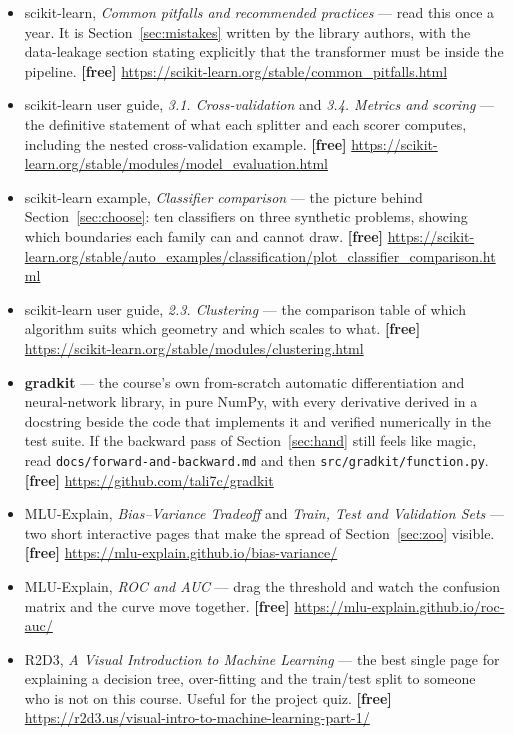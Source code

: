 \documentclass[11pt]{article}
\begin{document}
\begin{itemize}[leftmargin=*]
  \item scikit-learn, \emph{Common pitfalls and recommended practices} ---
    read this once a year. It is Section~\ref{sec:mistakes} written by the
    library authors, with the data-leakage section stating explicitly that
    the transformer must be inside the pipeline. \textbf{[free]}
    \url{https://scikit-learn.org/stable/common_pitfalls.html}
  \item scikit-learn user guide, \emph{3.1. Cross-validation} and
    \emph{3.4. Metrics and scoring} --- the definitive statement of what each
    splitter and each scorer computes, including the nested
    cross-validation example. \textbf{[free]}
    \url{https://scikit-learn.org/stable/modules/model_evaluation.html}
  \item scikit-learn example, \emph{Classifier comparison} --- the picture
    behind Section~\ref{sec:choose}: ten classifiers on three synthetic
    problems, showing which boundaries each family can and cannot draw.
    \textbf{[free]}
    \url{https://scikit-learn.org/stable/auto_examples/classification/plot_classifier_comparison.html}
  \item scikit-learn user guide, \emph{2.3. Clustering} --- the comparison
    table of which algorithm suits which geometry and which scales to what.
    \textbf{[free]} \url{https://scikit-learn.org/stable/modules/clustering.html}
  \item \textbf{gradkit} --- the course's own from-scratch automatic
    differentiation and neural-network library, in pure NumPy, with every
    derivative derived in a docstring beside the code that implements it and
    verified numerically in the test suite. If the backward pass of
    Section~\ref{sec:hand} still feels like magic, read
    \texttt{docs/forward-and-backward.md} and then
    \texttt{src/gradkit/function.py}. \textbf{[free]}
    \url{https://github.com/tali7c/gradkit}
  \item MLU-Explain, \emph{Bias--Variance Tradeoff} and
    \emph{Train, Test and Validation Sets} --- two short interactive pages
    that make the spread of Section~\ref{sec:zoo} visible.
    \textbf{[free]} \url{https://mlu-explain.github.io/bias-variance/}
  \item MLU-Explain, \emph{ROC and AUC} --- drag the threshold and watch the
    confusion matrix and the curve move together. \textbf{[free]}
    \url{https://mlu-explain.github.io/roc-auc/}
  \item R2D3, \emph{A Visual Introduction to Machine Learning} --- the best
    single page for explaining a decision tree, over-fitting and the
    train/test split to someone who is not on this course. Useful for the
    project quiz. \textbf{[free]}
    \url{https://r2d3.us/visual-intro-to-machine-learning-part-1/}
\end{itemize}
\end{document}
